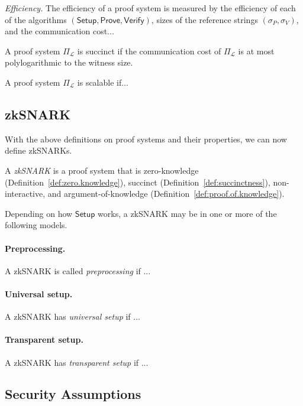 \documentclass[acmtog]{acmart}
\newcommand{\cL}{\mathcal{L}}
\newcommand{\Setup}{\mathsf{Setup}}
\newcommand{\Prove}{\mathsf{Prove}}
\newcommand{\Verify}{\mathsf{Verify}}
\newcommand{\PiL}{\Pi_{\cL}}
\begin{document}
\emph{Efficiency.} The efficiency of a proof system is measured by the efficiency of each of the algorithms $(\Setup,\Prove,\Verify)$, sizes of the reference strings $(\sigma_P,\sigma_V)$, and the communication cost...

\begin{definition}[Succinctness]
\label{def:succinctness}
A proof system $\PiL$ is succinct if the communication cost of $\PiL$ is at most polylogarithmic to the witness size.
\end{definition}

\begin{definition}[Scalability]
\label{def:scalability}
A proof system $\PiL$ is scalable if...
\end{definition}

\subsection{zkSNARK}
\label{sec:zksnark}

With the above definitions on proof systems and their properties, we can now define zkSNARKs.

\begin{definition}[zkSNARK]
A \emph{zkSNARK} is a proof system that is zero-knowledge (Definition~\ref{def:zero.knowledge}), succinct (Definition~\ref{def:succinctness}), non-interactive, and argument-of-knowledge (Definition~\ref{def:proof.of.knowledge}).
\end{definition}

Depending on how $\Setup$ works, a zkSNARK may be in one or more of the following models.

\paragraph{Preprocessing.} A zkSNARK is called \emph{preprocessing} if ...

\paragraph{Universal setup.} A zkSNARK has \emph{universal setup} if ...

\paragraph{Transparent setup.} A zkSNARK has \emph{transparent setup} if ...

\subsection{Security Assumptions}
\label{sec:security}
\end{document}
